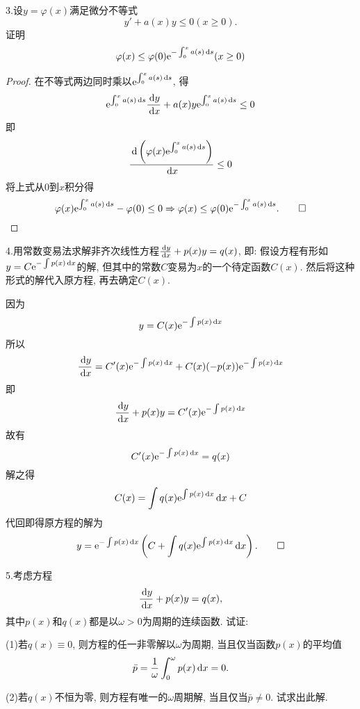3.设$y=\varphi(x)$满足微分不等式
\[y'+a(x)y\leq0(x\geq0).\]
证明\[\varphi(x)\leq\varphi(0)\mathrm{e}^{-\int_0^xa(s)\,\mathrm{d} s}(x\geq0)\]
\begin{proof} 
在不等式两边同时乘以$\mathrm{e}^{\int_0^xa(s)\,\mathrm{d} s}$, 得
\[\mathrm{e}^{\int_0^xa(s)\,\mathrm{d} s}\frac{\,\mathrm{d} y}{\,\mathrm{d} x}+a(x)y\mathrm{e}^{\int_0^xa(s)\,\mathrm{d} s}\leq0\]
即\[\frac{\,\mathrm{d}\left(\varphi(x)\mathrm{e}^{\int_0^xa(s)\,\mathrm{d} s}\right)}{\,\mathrm{d} x}\leq0\]
将上式从0到$x$积分得\[\varphi(x)\mathrm{e}^{\int_0^xa(s)\,\mathrm{d} s}-\varphi(0)\leq0\Rightarrow\varphi(x)\leq\varphi(0)\mathrm{e}^{-\int_0^xa(s)\,\mathrm{d} s}.\qedhere\]
\end{proof}


4.用常数变易法求解非齐次线性方程$\frac{\,\mathrm{d} y}{\,\mathrm{d} x}+p(x)y=q(x)$, 即: 
假设方程有形如$y=C\mathrm{e}^{-\int p(x)\,\mathrm{d} x}$的解, 但其中的常数$C$变易为$x$的一个待定函数$C(x)$. 
然后将这种形式的解代入原方程, 再去确定$C(x)$.

\begin{solve}
因为\[y=C(x)\mathrm{e}^{-\int p(x)\,\mathrm{d} x}\]
所以\[\frac{\,\mathrm{d} y}{\,\mathrm{d} x}=C'(x)\mathrm{e}^{-\int p(x)\,\mathrm{d} x}+C(x)(-p(x))\mathrm{e}^{-\int p(x)\,\mathrm{d} x}\]
即\[\frac{\,\mathrm{d} y}{\,\mathrm{d} x}+p(x)y=C'(x)\mathrm{e}^{-\int p(x)\,\mathrm{d} x}\]
故有
\[C'(x)\mathrm{e}^{-\int p(x)\,\mathrm{d} x}=q(x)\]
解之得\[C(x)=\int q(x)\mathrm{e}^{\int p(x)\,\mathrm{d} x}\,\mathrm{d} x+C\]
代回即得原方程的解为\[y=\mathrm{e}^{-\int p(x)\,\mathrm{d} x}\left(C+\int q(x)\mathrm{e}^{\int p(x)\,\mathrm{d} x}\,\mathrm{d} x\right).\qedhere\]
\end{solve}


5.考虑方程
\[\frac{\,\mathrm{d} y}{\,\mathrm{d} x}+p(x)y=q(x),\]
其中$p(x)$和$q(x)$都是以$\omega>0$为周期的连续函数. 试证:

(1)若$q(x)\equiv0$, 则方程的任一非零解以$\omega$为周期, 当且仅当函数$p(x)$的平均值
\[\bar{p}=\frac{1}{\omega}\int_0^{\omega}p(x)\,\mathrm{d} x=0.\]

(2)若$q(x)$不恒为零, 则方程有唯一的$\omega$周期解, 当且仅当$\bar{p}\neq0$. 试求出此解.

